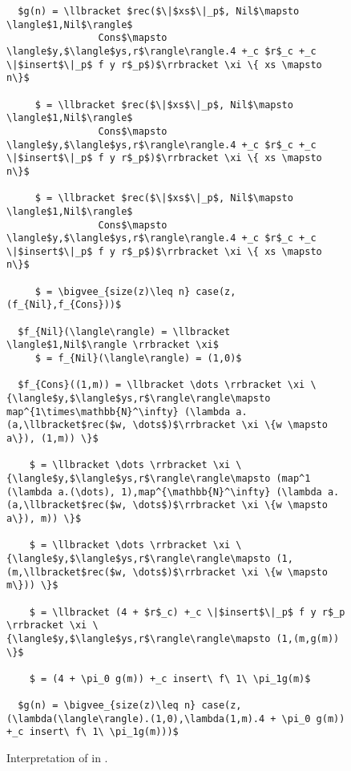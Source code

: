 \begin{figure}[H]
  \caption{Interpretation of  in .}
  \label{fig:sort_rec_interp}
  \begin{lstlisting}
  $g(n) = \llbracket $rec($\|$xs$\|_p$, Nil$\mapsto \langle$1,Nil$\rangle$
                Cons$\mapsto \langle$y,$\langle$ys,r$\rangle\rangle.4 +_c $r$_c +_c \|$insert$\|_p$ f y r$_p$)$\rrbracket \xi \{ xs \mapsto n\}$

     $ = \llbracket $rec($\|$xs$\|_p$, Nil$\mapsto \langle$1,Nil$\rangle$
                Cons$\mapsto \langle$y,$\langle$ys,r$\rangle\rangle.4 +_c $r$_c +_c \|$insert$\|_p$ f y r$_p$)$\rrbracket \xi \{ xs \mapsto n\}$

     $ = \llbracket $rec($\|$xs$\|_p$, Nil$\mapsto \langle$1,Nil$\rangle$
                Cons$\mapsto \langle$y,$\langle$ys,r$\rangle\rangle.4 +_c $r$_c +_c \|$insert$\|_p$ f y r$_p$)$\rrbracket \xi \{ xs \mapsto n\}$

     $ = \bigvee_{size(z)\leq n} case(z,(f_{Nil},f_{Cons}))$

  $f_{Nil}(\langle\rangle) = \llbracket \langle$1,Nil$\rangle \rrbracket \xi$
     $ = f_{Nil}(\langle\rangle) = (1,0)$

  $f_{Cons}((1,m)) = \llbracket \dots \rrbracket \xi \{\langle$y,$\langle$ys,r$\rangle\rangle\mapsto map^{1\times\mathbb{N}^\infty} (\lambda a.(a,\llbracket$rec($w, \dots$)$\rrbracket \xi \{w \mapsto a\}), (1,m)) \}$

    $ = \llbracket \dots \rrbracket \xi \{\langle$y,$\langle$ys,r$\rangle\rangle\mapsto (map^1 (\lambda a.(\dots), 1),map^{\mathbb{N}^\infty} (\lambda a.(a,\llbracket$rec($w, \dots$)$\rrbracket \xi \{w \mapsto a\}), m)) \}$

    $ = \llbracket \dots \rrbracket \xi \{\langle$y,$\langle$ys,r$\rangle\rangle\mapsto (1,(m,\llbracket$rec($w, \dots$)$\rrbracket \xi \{w \mapsto m\})) \}$

    $ = \llbracket (4 + $r$_c) +_c \|$insert$\|_p$ f y r$_p \rrbracket \xi \{\langle$y,$\langle$ys,r$\rangle\rangle\mapsto (1,(m,g(m)) \}$

    $ = (4 + \pi_0 g(m)) +_c insert\ f\ 1\ \pi_1g(m)$

  $g(n) = \bigvee_{size(z)\leq n} case(z,(\lambda(\langle\rangle).(1,0),\lambda(1,m).4 + \pi_0 g(m)) +_c insert\ f\ 1\ \pi_1g(m)))$
  \end{lstlisting}
\end{figure}
